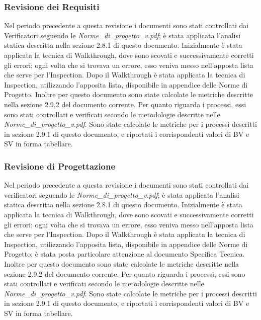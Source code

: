 \subsubsection{Revisione dei Requisiti}
Nel periodo precedente a questa revisione i documenti sono stati controllati dai Verificatori seguendo le \emph{Norme\_di\_progetto\_v\versioneNormeDiProgetto{}.pdf}; è stata applicata l'analisi statica descritta nella sezione 2.8.1 di questo documento.
Inizialmente è stata applicata la tecnica di Walkthrough, dove sono scovati e successivamente corretti gli errori; ogni volta che si trovava un errore, esso veniva messo nell'apposta lista che serve per l'Inspection.
Dopo il Walkthrough è stata applicata la tecnica di Inspection, utilizzando l'apposita lista, disponibile in appendice delle Norme di Progetto. Inoltre per questo documento sono state calcolate le metriche descritte nella sezione 2.9.2 del documento corrente.
Per quanto riguarda i processi, essi sono stati controllati e verificati secondo le metodologie descritte nelle  \emph{Norme\_di\_progetto\_v\versioneNormeDiProgetto{}.pdf}. Sono state calcolate le metriche per i processi descritti in sezione 2.9.1 di questo documento, e riportati i corrispondenti valori di BV e SV in forma tabellare.

\subsubsection{Revisione di Progettazione}
Nel periodo precedente a questa revisione i documenti sono stati controllati dai verificatori seguendo le \emph{Norme\_di\_progetto\_v\versioneNormeDiProgetto{}.pdf}; è stata applicata l'analisi statica descritta nella sezione 2.8.1 di questo documento.
Inizialmente è stata applicata la tecnica di Walkthrough, dove sono scovati e successivamente corretti gli errori; ogni volta che si trovava un errore, esso veniva messo nell'apposta lista che serve per l'Inspection.
Dopo il Walkthrough è stata applicata la tecnica di Inspection, utilizzando l'apposita lista, disponibile in appendice delle Norme di Progetto; è stata posta particolare attenzione al documento Specifica Tecnica. Inoltre per questo documento sono state calcolate le metriche descritte nella sezione 2.9.2 del documento corrente.
Per quanto riguarda i processi, essi sono stati controllati e verificati secondo le metodologie descritte nelle \emph{Norme\_di\_progetto\_v\versioneNormeDiProgetto{}.pdf}. Sono state calcolate le metriche per i processi descritti in sezione 2.9.1 di questo documento, e riportati i corrispondenti valori di BV e SV in forma tabellare.
